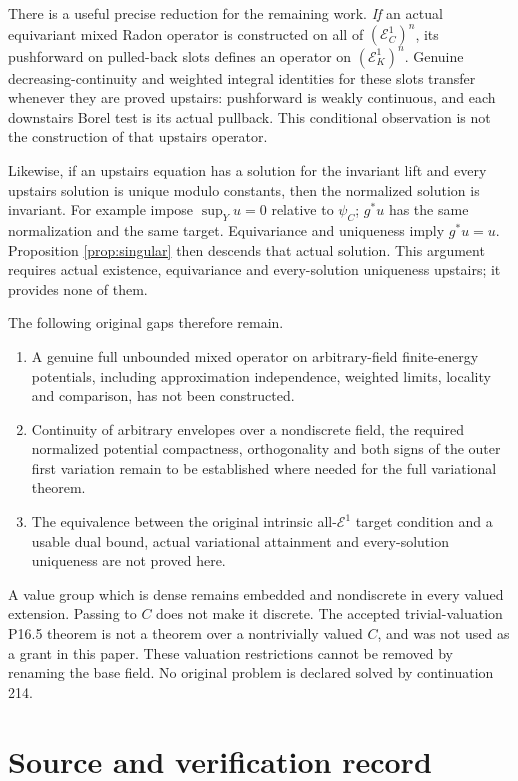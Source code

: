 \documentclass[11pt]{article}
\theoremstyle{remark}
\newcommand{\E}{\mathcal E}
\begin{document}
There is a useful precise reduction for the remaining work.
\emph{If} an actual equivariant mixed Radon operator is constructed
on all of $(\E_C^1)^n$, its pushforward on pulled-back slots defines
an operator on $(\E_K^1)^n$. Genuine decreasing-continuity and
weighted integral identities for these slots transfer whenever they
are proved upstairs: pushforward is weakly continuous, and each
downstairs Borel test is its actual pullback. This conditional
observation is not the construction of that upstairs operator.

Likewise, if an upstairs equation has a solution for the invariant
lift and every upstairs solution is unique modulo constants, then
the normalized solution is invariant. For example impose
$\sup_Y u=0$ relative to $\psi_C$; $g^*u$ has the same normalization
and the same target. Equivariance and uniqueness imply $g^*u=u$.
Proposition \ref{prop:singular} then descends that actual solution.
This argument requires actual existence, equivariance and
every-solution uniqueness upstairs; it provides none of them.

The following original gaps therefore remain.
\begin{enumerate}
\item A genuine full unbounded mixed operator on arbitrary-field
finite-energy potentials, including approximation independence,
weighted limits, locality and comparison, has not been constructed.
\item Continuity of arbitrary envelopes over a nondiscrete field,
the required normalized potential compactness, orthogonality and
both signs of the outer first variation remain to be established
where needed for the full variational theorem.
\item The equivalence between the original intrinsic all-$\E^1$
target condition and a usable dual bound, actual variational
attainment and every-solution uniqueness are not proved here.
\end{enumerate}
A value group which is dense remains embedded and nondiscrete in
every valued extension. Passing to $C$ does not make it discrete.
The accepted trivial-valuation P16.5 theorem is not a theorem over
a nontrivially valued $C$, and was not used as a grant in this paper.
These valuation restrictions cannot be removed by renaming the
base field. No original problem is declared solved by continuation 214.

\section{Source and verification record}
\end{document}
